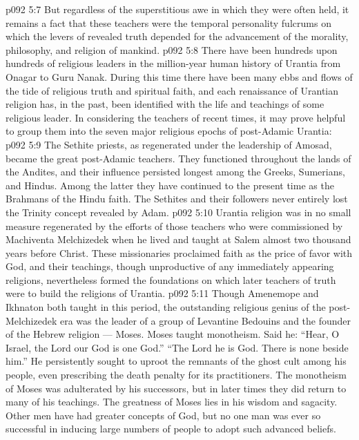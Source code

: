 \vs p092 5:7 But regardless of the superstitious awe in which they were often held, it remains a fact that these teachers were the temporal personality fulcrums on which the levers of revealed truth depended for the advancement of the morality, philosophy, and religion of mankind.
\vs p092 5:8 There have been hundreds upon hundreds of religious leaders in the million\hyp{}year human history of Urantia from Onagar to Guru Nanak. During this time there have been many ebbs and flows of the tide of religious truth and spiritual faith, and each renaissance of Urantian religion has, in the past, been identified with the life and teachings of some religious leader. In considering the teachers of recent times, it may prove helpful to group them into the seven major religious epochs of post\hyp{}Adamic Urantia:
\vs p092 5:9 \bibnobreakspace {} The Sethite priests, as regenerated under the leadership of Amosad, became the great post\hyp{}Adamic teachers. They functioned throughout the lands of the Andites, and their influence persisted longest among the Greeks, Sumerians, and Hindus. Among the latter they have continued to the present time as the Brahmans of the Hindu faith. The Sethites and their followers never entirely lost the Trinity concept revealed by Adam.
\vs p092 5:10 \pc {}\bibnobreakspace {} Urantia religion was in no small measure regenerated by the efforts of those teachers who were commissioned by Machiventa Melchizedek when he lived and taught at Salem almost two thousand years before Christ. These missionaries proclaimed faith as the price of favor with God, and their teachings, though unproductive of any immediately appearing religions, nevertheless formed the foundations on which later teachers of truth were to build the religions of Urantia.
\vs p092 5:11 \pc {}\bibnobreakspace {} Though Amenemope and Ikhnaton both taught in this period, the outstanding religious genius of the post\hyp{}Melchizedek era was the leader of a group of Levantine Bedouins and the founder of the Hebrew religion --- Moses. Moses taught monotheism. Said he: “Hear, O Israel, the Lord our God is one God.” “The Lord he is God. There is none beside him.” He persistently sought to uproot the remnants of the ghost cult among his people, even prescribing the death penalty for its practitioners. The monotheism of Moses was adulterated by his successors, but in later times they did return to many of his teachings. The greatness of Moses lies in his wisdom and sagacity. Other men have had greater concepts of God, but no one man was ever so successful in inducing large numbers of people to adopt such advanced beliefs.
